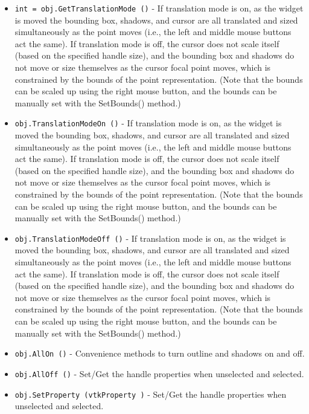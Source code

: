 \begin{itemize}
\item  \verb|int = obj.GetTranslationMode ()| -  If translation mode is on, as the widget is moved the bounding box,
 shadows, and cursor are all translated and sized simultaneously as the
 point moves (i.e., the left and middle mouse buttons act the same). If
 translation mode is off, the cursor does not scale itself (based on the
 specified handle size), and the bounding box and shadows do not move or
 size themselves as the cursor focal point moves, which is constrained by
 the bounds of the point representation. (Note that the bounds can be
 scaled up using the right mouse button, and the bounds can be manually
 set with the SetBounds() method.)

\item  \verb|obj.TranslationModeOn ()| -  If translation mode is on, as the widget is moved the bounding box,
 shadows, and cursor are all translated and sized simultaneously as the
 point moves (i.e., the left and middle mouse buttons act the same). If
 translation mode is off, the cursor does not scale itself (based on the
 specified handle size), and the bounding box and shadows do not move or
 size themselves as the cursor focal point moves, which is constrained by
 the bounds of the point representation. (Note that the bounds can be
 scaled up using the right mouse button, and the bounds can be manually
 set with the SetBounds() method.)

\item  \verb|obj.TranslationModeOff ()| -  If translation mode is on, as the widget is moved the bounding box,
 shadows, and cursor are all translated and sized simultaneously as the
 point moves (i.e., the left and middle mouse buttons act the same). If
 translation mode is off, the cursor does not scale itself (based on the
 specified handle size), and the bounding box and shadows do not move or
 size themselves as the cursor focal point moves, which is constrained by
 the bounds of the point representation. (Note that the bounds can be
 scaled up using the right mouse button, and the bounds can be manually
 set with the SetBounds() method.)

\item  \verb|obj.AllOn ()| -  Convenience methods to turn outline and shadows on and off.

\item  \verb|obj.AllOff ()| -  Set/Get the handle properties when unselected and selected.

\item  \verb|obj.SetProperty (vtkProperty )| -  Set/Get the handle properties when unselected and selected.


\end{itemize}
